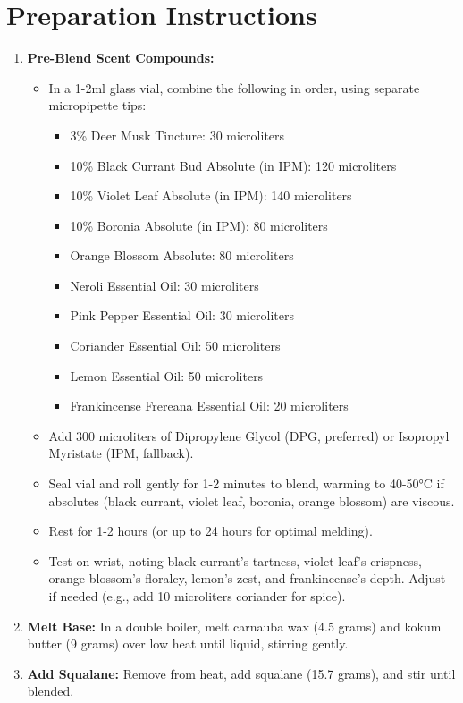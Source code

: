 \documentclass{article}
\begin{document}
\section*{Preparation Instructions}
\begin{enumerate}
  \item \textbf{Pre-Blend Scent Compounds:}
  \begin{itemize}
    \item In a 1-2ml glass vial, combine the following in order, using separate micropipette tips:
    \begin{itemize}
      \item 3\% Deer Musk Tincture: 30 microliters
      \item 10\% Black Currant Bud Absolute (in IPM): 120 microliters
      \item 10\% Violet Leaf Absolute (in IPM): 140 microliters
      \item 10\% Boronia Absolute (in IPM): 80 microliters
      \item Orange Blossom Absolute: 80 microliters
      \item Neroli Essential Oil: 30 microliters
      \item Pink Pepper Essential Oil: 30 microliters
      \item Coriander Essential Oil: 50 microliters
      \item Lemon Essential Oil: 50 microliters
      \item Frankincense Frereana Essential Oil: 20 microliters
    \end{itemize}
    \item Add 300 microliters of Dipropylene Glycol (DPG, preferred) or Isopropyl Myristate (IPM, fallback).
    \item Seal vial and roll gently for 1-2 minutes to blend, warming to 40-50°C if absolutes (black currant, violet leaf, boronia, orange blossom) are viscous.
    \item Rest for 1-2 hours (or up to 24 hours for optimal melding).
    \item Test on wrist, noting black currant’s tartness, violet leaf’s crispness, orange blossom’s floralcy, lemon’s zest, and frankincense’s depth. Adjust if needed (e.g., add 10 microliters coriander for spice).
  \end{itemize}
  \item \textbf{Melt Base:} In a double boiler, melt carnauba wax (4.5 grams) and kokum butter (9 grams) over low heat until liquid, stirring gently.
  \item \textbf{Add Squalane:} Remove from heat, add squalane (15.7 grams), and stir until blended.

\end{enumerate}
\end{document}
